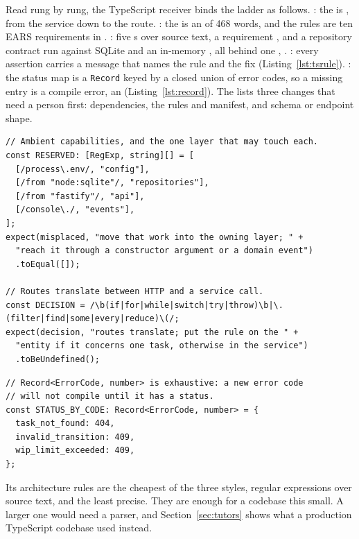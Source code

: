 Read rung by rung, the TypeScript receiver binds the ladder as follows.
: the  is , from the service down to the route.
: the  is an  of 468 words, and the rules
are ten EARS requirements in . : five s over source text, a requirement , and a repository contract run
against SQLite and an in-memory , all behind one ,
. : every assertion carries a  message that
names the rule and the fix (Listing~\ref{lst:tsrule}). : the status map is a
\texttt{Record} keyed by a closed union of error codes, so a missing entry is a compile error,
an  (Listing~\ref{lst:record}). The 
lists three changes that need a person first: dependencies, the rules and manifest, and schema
or endpoint shape.

\begin{lstlisting}[caption={Two executable rules with teaching failures in the TypeScript receiver. The second closes a gap that no behavioural test can see (Section~\ref{sec:evaluation}).},label=lst:tsrule]
// Ambient capabilities, and the one layer that may touch each.
const RESERVED: [RegExp, string][] = [
  [/process\.env/, "config"],
  [/from "node:sqlite"/, "repositories"],
  [/from "fastify"/, "api"],
  [/console\./, "events"],
];
expect(misplaced, "move that work into the owning layer; " +
  "reach it through a constructor argument or a domain event")
  .toEqual([]);

// Routes translate between HTTP and a service call.
const DECISION = /\b(if|for|while|switch|try|throw)\b|\.(filter|find|some|every|reduce)\(/;
expect(decision, "routes translate; put the rule on the " +
  "entity if it concerns one task, otherwise in the service")
  .toBeUndefined();
\end{lstlisting}

\begin{lstlisting}[caption={Unrepresentable Mistake in the TypeScript receiver.},label=lst:record]
// Record<ErrorCode, number> is exhaustive: a new error code
// will not compile until it has a status.
const STATUS_BY_CODE: Record<ErrorCode, number> = {
  task_not_found: 404,
  invalid_transition: 409,
  wip_limit_exceeded: 409,
};
\end{lstlisting}

Its architecture rules are the cheapest of the three styles, regular expressions over source
text, and the least precise. They are enough for a codebase this small. A larger one would need
a parser, and Section~\ref{sec:tutors} shows what a production TypeScript codebase used
instead.

